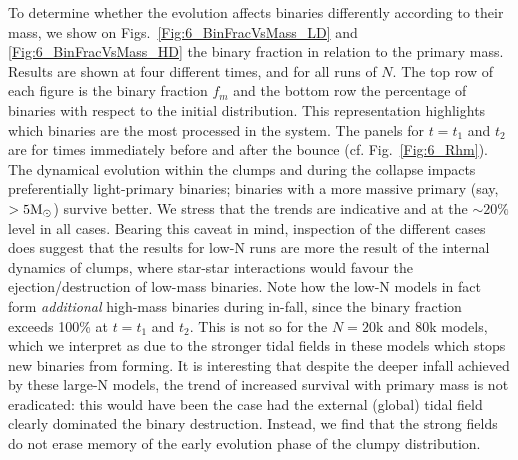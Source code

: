 To determine whether the evolution affects binaries differently according to their mass, we show on Figs.~\ref{Fig:6_BinFracVsMass_LD} and \ref{Fig:6_BinFracVsMass_HD} the binary fraction in relation to the primary mass. Results are shown at four different times, and for all runs of $N$. The top row of each figure is the binary fraction $f_m$ and the bottom row the percentage of binaries with respect to the initial distribution. 
This representation highlights which binaries are the most processed in the system. The panels for $t = t_1$ and $t_2$ are for times immediately before and after the bounce (cf. Fig.~\ref{Fig:6_Rhm}). The dynamical evolution within the clumps and during the collapse impacts preferentially light-primary binaries; binaries with a more massive primary (say, $> 5 {\textrm{M}_\odot}$) survive better. We stress that the trends are indicative and at the $\sim 20\% $ level in all cases. Bearing this caveat in mind, inspection of the different cases does suggest that the results for low-N runs are more the result of the internal dynamics of clumps, where star-star interactions would favour the ejection/destruction of low-mass binaries. Note how the low-N models in fact form {\it additional} high-mass binaries during in-fall, since the binary fraction exceeds 100\% at $t = t_1 $ and $t_2$. This is not so for the $N = 20$k and $80$k models, which we interpret as due to the stronger tidal fields in these models which stops new binaries from forming. It is interesting that despite the deeper infall achieved by  these large-N models, the trend of increased survival with primary mass is not eradicated: this would have been the case had the external (global) tidal field clearly dominated the binary destruction. Instead, we find that the strong fields do not erase memory of the early evolution phase of the clumpy distribution. 


